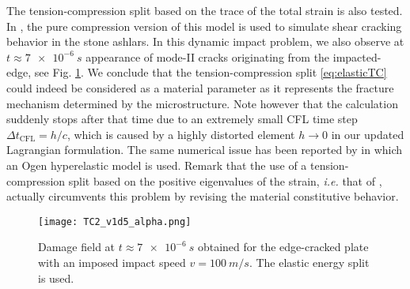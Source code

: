 The tension-compression split based on the trace of the total strain \cite{AmorMarigoMaurini:2009} is also tested. In \cite{LancioniRoyer-Carfagni:2009}, the pure compression version of this model is used to simulate shear cracking behavior in the stone ashlars. In this dynamic impact problem, we also observe at $t\approx\SI{7e-6}{s}$ appearance of mode-\RN{2} cracks originating from the impacted-edge, see Fig. \ref{fig:TC2}. We conclude that the tension-compression split \eqref{eq:elasticTC} could indeed be considered as a material parameter as it represents the fracture mechanism determined by the microstructure. Note however that the calculation suddenly stops after that time due to an extremely small CFL time step $\Delta t_\mathrm{CFL}=h/c$, which is caused by a highly distorted element $h\to 0$ in our updated Lagrangian formulation. The same numerical issue has been reported by \cite{PieroLancioniMarch:2007} in which an Ogen hyperelastic model is used. Remark that the use of a tension-compression split based on the positive eigenvalues of the strain, \emph{i.e.} that of \cite{MieheHofackerWelschinger:2010,FreddiRoyer-Carfagni:2010}, actually circumvents this problem by revising the material constitutive behavior.
\begin{figure}[htbp]
\centering
\texttt{[image: TC2\_v1d5\_alpha.png]}
\caption{Damage field at $t\approx\SI{7e-6}{s}$ obtained for the edge-cracked plate with an imposed impact speed $v=\SI{100}{m/s}$. The elastic energy split \cite{AmorMarigoMaurini:2009} is used.} \label{fig:TC2}
\end{figure}

